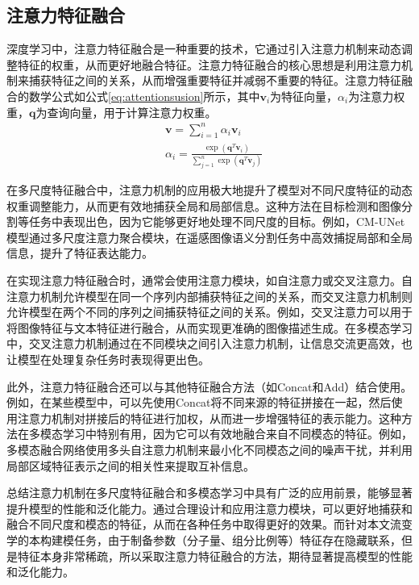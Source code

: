 \subsection{注意力特征融合}
深度学习中，注意力特征融合是一种重要的技术，它通过引入注意力机制来动态调整特征的权重，从而更好地融合特征\cite{dai2021attentional}。注意力特征融合的核心思想是利用注意力机制来捕获特征之间的关系，从而增强重要特征并减弱不重要的特征。注意力特征融合的数学公式如公式\eqref{eq:attentionsusion}所示，其中$\mathbf{v}_i$为特征向量，$\alpha_i$为注意力权重，$\mathbf{q}$为查询向量，用于计算注意力权重。
\begin{equation}
  \begin{aligned}
     & \mathbf{v} = \sum_{i=1}^{n} \alpha_i \mathbf{v}_i                                                 \\
     & \alpha_i = \frac{\exp(\mathbf{q}^T \mathbf{v}_i)}{\sum_{j=1}^{n} \exp(\mathbf{q}^T \mathbf{v}_j)}
  \end{aligned}   \label{eq:attentionsusion}
\end{equation}

在多尺度特征融合中，注意力机制的应用极大地提升了模型对不同尺度特征的动态权重调整能力，从而更有效地捕获全局和局部信息。这种方法在目标检测和图像分割等任务中表现出色，因为它能够更好地处理不同尺度的目标。例如，CM-UNet模型通过多尺度注意力聚合模块，在遥感图像语义分割任务中高效捕捉局部和全局信息，提升了特征表达能力\cite{Cui2023CMUnet}。

在实现注意力特征融合时，通常会使用注意力模块，如自注意力或交叉注意力。自注意力机制允许模型在同一个序列内部捕获特征之间的关系，而交叉注意力机制则允许模型在两个不同的序列之间捕获特征之间的关系。例如，交叉注意力可以用于将图像特征与文本特征进行融合，从而实现更准确的图像描述生成。在多模态学习中，交叉注意力机制通过在不同模块之间引入注意力机制，让信息交流更高效，也让模型在处理复杂任务时表现得更出色\cite{rong2023dynstatf}。

此外，注意力特征融合还可以与其他特征融合方法（如Concat和Add）结合使用。例如，在某些模型中，可以先使用Concat将不同来源的特征拼接在一起，然后使用注意力机制对拼接后的特征进行加权，从而进一步增强特征的表示能力。这种方法在多模态学习中特别有用，因为它可以有效地融合来自不同模态的特征。例如，多模态融合网络使用多头自注意力机制来最小化不同模态之间的噪声干扰，并利用局部区域特征表示之间的相关性来提取互补信息\cite{nagrani2021attention}。

总结注意力机制在多尺度特征融合和多模态学习中具有广泛的应用前景，能够显著提升模型的性能和泛化能力。通过合理设计和应用注意力模块，可以更好地捕获和融合不同尺度和模态的特征，从而在各种任务中取得更好的效果。而针对本文流变学的本构建模任务，由于制备参数（分子量、组分比例等）特征存在隐藏联系，但是特征本身非常稀疏，所以采取注意力特征融合的方法，期待显著提高模型的性能和泛化能力。
